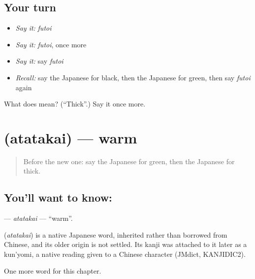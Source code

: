 \subsection*{Your turn}
\begin{itemize}
\raggedright
  \item \emph{Say it:} \emph{futoi}
  \item \emph{Say it:} \emph{futoi}, once more
  \item \emph{Say it:} say \emph{futoi}
  \item \emph{Recall:} say the Japanese for black, then the Japanese for green, then say \emph{futoi} again
\end{itemize}

\begin{tcolorbox}[breakable,colback=teal!4,colframe=teal!35!black,title={Before you move on}]
What does  mean? (\textquotedblleft{}Thick\textquotedblright{}.) Say it once more.
\end{tcolorbox}
\section[\texorpdfstring{\ja{あたたかい} (atatakai)}{あたたかい (atatakai)}]{ (atatakai) — warm}

\label{lesson:JA-C52-atatakai}



\begin{quote}
Before the new one: say the Japanese for green, then the Japanese for thick.
\end{quote}

\subsection*{You'll want to know: }
\textbf{} — \emph{atatakai} — \textquotedblleft{}warm\textquotedblright{}.

\begin{cousinweb}
\textbf{} (\emph{atatakai}) is a native Japanese word, inherited rather than borrowed from Chinese, and its older origin is not settled. Its kanji was attached to it later as a kun'yomi, a native reading given to a Chinese character (JMdict, KANJIDIC2).
\end{cousinweb}

\begin{grammarlens}[title={What you've built}]
One more word for this chapter.
\end{grammarlens}

